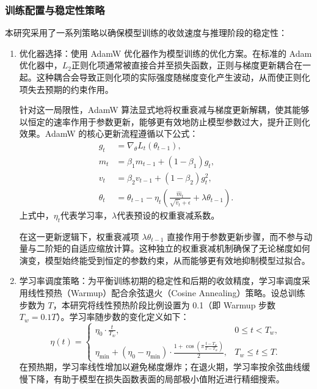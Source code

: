\subsubsection{训练配置与稳定性策略}
本研究采用了一系列策略以确保模型训练的收敛速度与推理阶段的稳定性：

\begin{enumerate}[label=(\arabic*)]
  \item 优化器选择：使用 AdamW 优化器作为模型训练的优化方案。在标准的 Adam 优化器中，$ L_2 $正则化项通常被直接合并至损失函数，正则与梯度更新耦合在一起。这种耦合会导致正则化项的实际强度随梯度变化产生波动，从而使正则化项失去预期的约束作用。

  针对这一局限性，AdamW 算法显式地将权重衰减与梯度更新解耦，使其能够以恒定的速率作用于参数更新，能够更有效地防止模型参数过大，提升正则化效果。AdamW 的核心更新流程遵循以下公式：
  \begin{equation}
  \begin{aligned}
  g_t &= \nabla_{\theta} L_t(\theta_{t-1}) ,
  \\
  m_t &= \beta_1 m_{t-1} + (1 - \beta_1) g_t, \\
  v_t &= \beta_2 v_{t-1} + (1 - \beta_2) g_t^2, \\
  \theta_t &= \theta_{t-1} - \eta_t \left( \frac{\hat{m}_t}{\sqrt{\hat{v}_t} + \epsilon} + \lambda \theta_{t-1} \right).
  \end{aligned}
  \end{equation}
  上式中，$ \eta_t $代表学习率，$ \lambda $代表预设的权重衰减系数。

  在这一更新逻辑下，权重衰减项 $ \lambda \theta_{t-1} $ 直接作用于参数更新步骤，而不参与动量与二阶矩的自适应缩放计算。这种独立的权重衰减机制确保了无论梯度如何演变，模型始终能受到恒定的参数约束，从而能够更有效地抑制模型过拟合。

  \item 学习率调度策略：为平衡训练初期的稳定性和后期的收敛精度，学习率调度采用线性预热（Warmup）配合余弦退火（Cosine Annealing）策略。设总训练步数为 $ T $，本研究将线性预热阶段比例设置为 0.1（即 Warmup 步数 $ T_w=0.1T $）。学习率随步数的变化定义如下：
  \begin{equation}
  \eta(t)=
  \begin{cases}
  \eta_0\cdot \frac{t}{T_w}, & 0\le t<T_w,\\
  \eta_{\min}+(\eta_0-\eta_{\min})\cdot \frac{1+\cos\left(\pi\frac{t-T_w}{T-T_w}\right)}{2}, & T_w\le t\le T.
  \end{cases}
  \end{equation}
  在预热期，学习率线性增加以避免梯度爆炸；在退火期，学习率按余弦曲线缓慢下降，有助于模型在损失函数表面的局部极小值附近进行精细搜索。


\end{enumerate}

